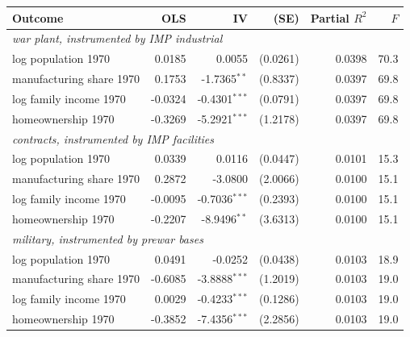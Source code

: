\begin{tabular}{lrrrrr}
\toprule
Outcome & OLS & IV & (SE) & Partial $R^2$ & $F$ \\
\midrule
\multicolumn{6}{l}{\emph{war plant, instrumented by IMP industrial}} \\
\quad log population 1970 & 0.0185 & 0.0055 & (0.0261) & 0.0398 & 70.3 \\
\quad manufacturing share 1970 & 0.1753 & -1.7365$^{**}$ & (0.8337) & 0.0397 & 69.8 \\
\quad log family income 1970 & -0.0324 & -0.4301$^{***}$ & (0.0791) & 0.0397 & 69.8 \\
\quad homeownership 1970 & -0.3269 & -5.2921$^{***}$ & (1.2178) & 0.0397 & 69.8 \\
\multicolumn{6}{l}{\emph{contracts, instrumented by IMP facilities}} \\
\quad log population 1970 & 0.0339 & 0.0116 & (0.0447) & 0.0101 & 15.3 \\
\quad manufacturing share 1970 & 0.2872 & -3.0800 & (2.0066) & 0.0100 & 15.1 \\
\quad log family income 1970 & -0.0095 & -0.7036$^{***}$ & (0.2393) & 0.0100 & 15.1 \\
\quad homeownership 1970 & -0.2207 & -8.9496$^{**}$ & (3.6313) & 0.0100 & 15.1 \\
\multicolumn{6}{l}{\emph{military, instrumented by prewar bases}} \\
\quad log population 1970 & 0.0491 & -0.0252 & (0.0438) & 0.0103 & 18.9 \\
\quad manufacturing share 1970 & -0.6085 & -3.8888$^{***}$ & (1.2019) & 0.0103 & 19.0 \\
\quad log family income 1970 & 0.0029 & -0.4233$^{***}$ & (0.1286) & 0.0103 & 19.0 \\
\quad homeownership 1970 & -0.3852 & -7.4356$^{***}$ & (2.2856) & 0.0103 & 19.0 \\
\bottomrule
\end{tabular}